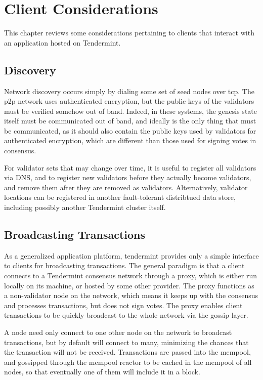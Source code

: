 \chapter{Client Considerations}
\label{ch:clients}

This chapter reviews some considerations pertaining to clients that interact with an application hosted on Tendermint.

\section{Discovery}

Network discovery occurs simply by dialing some set of seed nodes over tcp.
The p2p network uses authenticated encryption, but the public keys of the validators must be verified somehow out of band.
Indeed, in these systems, the genesis state itself must be communicated out of band, and ideally is the only thing that must be communicated, 
as it should also contain the public keys used by validators for authenticated encryption, 
which are different than those used for signing votes in consensus.

For validator sets that may change over time, it is useful to register all validators via DNS, 
and to register new validators before they actually become validators, and remove them after they are removed as validators.
Alternatively, validator locations can be registered in another fault-tolerant distribtued data store, 
including possibly another Tendermint cluster itself.

\section{Broadcasting Transactions}

As a generalized application platform, tendermint provides only a simple interface to clients for broadcasting transactions.
The general paradigm is that a client connects to a Tendermint consensus network through a proxy, which is either run locally on its machine,
or hosted by some other provider. The proxy functions as a non-validator node on the network, 
which means it keeps up with the consensus and processes transactions, but does not sign votes.
The proxy enables client transactions to be quickly broadcast to the whole network via the gossip layer.

A node need only connect to one other node on the network to broadcast transactions, but by default will connect to many,
minimizing the chances that the transaction will not be received.
Transactions are passed into the mempool, 
and gossipped through the mempool reactor to be cached in the mempool of all nodes, 
so that eventually one of them will include it in a block. 

